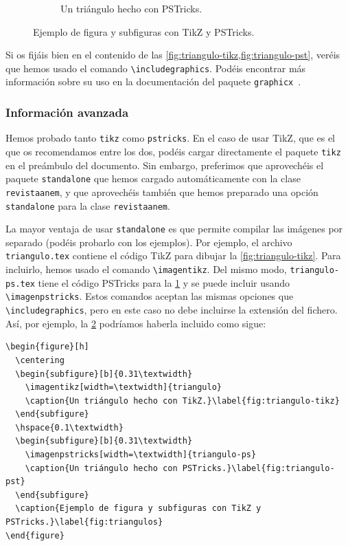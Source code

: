 \documentclass[%
extracommands,%
]{revistaanem}
\begin{document}
\begin{figure}[h]
\begin{subfigure}[b]{0.31\textwidth}
    \caption{Un triángulo hecho con PSTricks.}\label{fig:triangulo-pst}
  \end{subfigure}
  \caption{Ejemplo de figura y subfiguras con TikZ y PSTricks.}\label{fig:triangulos}
\end{figure}

Si os fijáis bien en el contenido de las \cref{fig:triangulo-tikz,fig:triangulo-pst}, veréis que hemos usado el comando \verb+\includegraphics+.
Podéis encontrar más información sobre su uso en la documentación del paquete \verb+graphicx+~\cite[sec.~4]{graphics}.

\subsubsection{Información avanzada}\label{sec:diagramas:avanzado}
Hemos probado tanto \verb+tikz+ como \verb+pstricks+.
En el caso de usar TikZ, que es el que os recomendamos entre los dos, podéis cargar directamente el paquete \verb+tikz+ en el preámbulo del documento.
Sin embargo, preferimos que aprovechéis el paquete \verb+standalone+ que hemos cargado automáticamente con la clase \verb+revistaanem+, y que aprovechéis también que hemos preparado una opción \verb+standalone+ para la clase \verb+revistaanem+.

La mayor ventaja de usar \verb+standalone+ es que permite compilar las imágenes por separado (podéis probarlo con los ejemplos).
Por ejemplo, el archivo \verb+triangulo.tex+ contiene el código TikZ para dibujar la \cref{fig:triangulo-tikz}.
Para incluirlo, hemos usado el comando \verb+\imagentikz+.
Del mismo modo, \verb+triangulo-ps.tex+ tiene el código PSTricks para la \cref{fig:triangulo-pst} y se puede incluir usando \verb+\imagenpstricks+.
Estos comandos aceptan las mismas opciones que \verb+\includegraphics+, pero en este caso no debe incluirse la extensión del fichero.
Así, por ejemplo, la \cref{fig:triangulos} podríamos haberla incluido como sigue:
\begin{verbatim}
\begin{figure}[h]
  \centering
  \begin{subfigure}[b]{0.31\textwidth}
    \imagentikz[width=\textwidth]{triangulo}
    \caption{Un triángulo hecho con TikZ.}\label{fig:triangulo-tikz}
  \end{subfigure}
  \hspace{0.1\textwidth}
  \begin{subfigure}[b]{0.31\textwidth}
    \imagenpstricks[width=\textwidth]{triangulo-ps}
    \caption{Un triángulo hecho con PSTricks.}\label{fig:triangulo-pst}
  \end{subfigure}
  \caption{Ejemplo de figura y subfiguras con TikZ y PSTricks.}\label{fig:triangulos}
\end{figure}
\end{verbatim}
\end{document}

